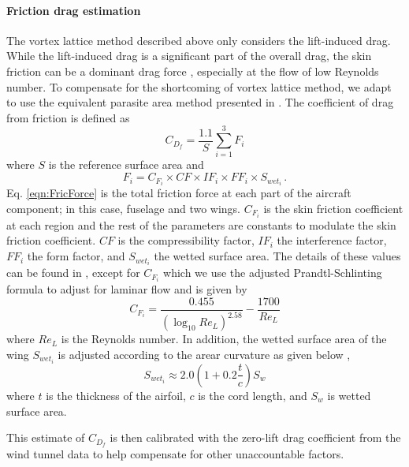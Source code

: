\documentclass[11pt]{ucthesis}
\begin{document}
\paragraph{Friction drag estimation}
The vortex lattice method described above only considers the lift-induced drag. While the lift-induced drag is a significant part of the overall drag, the skin friction can be a dominant drag force \cite{thomas1984aircraft}, especially at the flow of low Reynolds number. To compensate for the shortcoming of vortex lattice method, we adapt to use the equivalent parasite area method presented in \cite{hull2007fundamentals}. The coefficient of drag from friction is defined as 
\begin{equation}
C_{D_f} = \frac{1.1}{S} \sum_{i=1}^{3} F_i
\end{equation}
where $S$ is the reference surface area and 
\begin{equation}
F_i = C_{F_i}\times CF\times IF_i\times FF_i\times S_{{wet}_i} \,.
\label{eqn:FricForce}
\end{equation}
Eq. \ref{eqn:FricForce} is the total friction force at each part of the aircraft component; in this case, fuselage and two wings. $C_{F_i}$ is the skin friction coefficient at each region and the rest of the parameters are constants to modulate the skin friction coefficient. $CF$ is the compressibility factor, $IF_i$ the interference factor, $FF_i$ the form factor, and $S_{{wet}_i}$ the wetted surface area. The details of these values can be found in \cite{hull2007fundamentals}, except for $C_{F_i}$ which we use the adjusted Prandtl-Schlinting formula to adjust for laminar flow and is given by \cite{bertin1998aerodynamics}
\begin{equation} \label{cfi_1}
C_{F_i} = \frac{0.455}{(\log_{10} Re_L)^{2.58}}-\frac{1700}{Re_L}
\end{equation} 
where $Re_L$ is the Reynolds number. In addition, the wetted surface area of the wing $S_{{wet}_i}$ is adjusted according to the arear curvature as given below \cite{bertin1998aerodynamics},
\begin{equation}
S_{{wet}_i}\approx 2.0 \left (1+0.2\frac{t}{c} \right ) S_w
\label{eqn:wetWing}
\end{equation}
where $t$ is the thickness of the airfoil, $c$ is the cord length, and $S_w$ is wetted surface area.

This estimate of $C_{D_f}$ is then calibrated with the zero-lift drag coefficient from the wind tunnel data to help compensate for other unaccountable factors.
\end{document}
